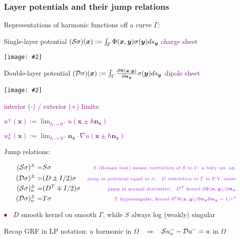 \documentclass[t]{beamer}
\newcommand{\ft}[1]{\frametitle{#1}}
\newcommand{\bea}{\begin{eqnarray}}
\newcommand{\eea}{\end{eqnarray}}
\newcommand{\mbf}[1]{{\bm #1}}           %
\newcommand{\com}[1]{{\scriptsize \textcolor{purple}{#1}}}      %
\newcommand{\vg}{\vspace{2ex}}
\newcommand{\sg}{\vspace{1ex}}
\newcommand{\rb}{\ensuremath{\textcolor{darkred}{\bullet\;}}\ }
\newcommand{\bmp}[1]{\begin{minipage}{#1}}
\newcommand{\emp}{\end{minipage}}
\newcommand{\pig}[2]{\bmp{#1}\texttt{[image: \#2]}\emp} %
\newcommand{\xx}{\mbf{x}}
\newcommand{\yy}{\mbf{y}}
\newcommand{\nn}{\mbf{n}}
\newcommand{\Srep}{{\cal S}}
\newcommand{\Drep}{{\cal D}}
\begin{document}
\begin{noframe}\ft{Layer potentials and their jump relations}


  \bmp{4in}
  Representations of harmonic functions off a curve $\Gamma$:
\;\com{``density'' $\sigma$}
  
  \sg

  Single-layer potential
  $(\Srep\sigma)(\xx) := \int_\Gamma \Phi(\xx,\yy) \sigma(\yy) ds_\yy$
  \;
    \com{charge sheet}
  \emp
\hfill \pig{.6in}{slp_lap}

  \bmp{4in}
  Double-layer potential
$(\Drep\sigma)(\xx) := \int_\Gamma \frac{\partial \Phi(\xx,\yy)}{\partial \nn_\yy}
  \sigma(\yy) ds_\yy$
  \com{dipole sheet}

  \vspace{4ex}

  \mbox{}
  \emp
\hfill \pig{.6in}{dlp_lap}

\vspace{-4ex}
\pause

\bmp{1.9in}
\com{interior (-) / exterior (+) limits:}
\emp
\bmp{2.5in}
\com{
  $u^{\pm}(\xx) := \lim_{h\to 0^+} u(\xx \pm h\nn_\xx)$    \quad 
}

\com{
  $u_n^{\pm}(\xx) := \lim_{h\to 0^+} \nn_\xx \cdot \nabla u(\xx \pm h\nn_\xx)$
 }
\emp

\vg

{\large Jump relations:}

\vspace{-4ex}

\bea
(\Srep\sigma)^\pm =&  S\sigma
 & \mbox{\com{$S$ (Roman font) means {\em restriction} of $\Srep$ to $\Gamma$: a bdry int.\ op.}}
\nonumber\\
(\Drep\sigma)^\pm =&  (D\pm I/2) \sigma
& \mbox{\com{jump in potential equal to $\sigma$; \; $D$ restriction to $\Gamma$ in P.V. sense}}
\nonumber\\
(\Srep\sigma)_n^\pm =&  (D^T\mp I/2) \sigma
& \mbox{\com{jump in normal derivative; \; $D^T$ kernel
$\partial \Phi(\xx,\yy) / \partial \nn_\xx$}} %
\nonumber \\
(\Drep\sigma)_n^\pm =&  T \sigma
& \mbox{\com{$T$ hypersingular, kernel $\partial^2 \Phi(\xx,\yy) / \partial \nn_\xx \partial \nn_\yy \sim 1/r^2$}}
\nonumber
\eea

\vspace{-1ex}

\rb $D$ smooth kernel on smooth $\Gamma$, while $S$ always log (weakly) singular



\vg
\pause

Recap GRF in LP notation:
\hfill $u$ harmonic in $\Omega$
$\;\;\Rightarrow\;\;$
$\Srep u_n^- - \Drep u^- = u$ in $\Omega$




\end{noframe}
\end{document}
